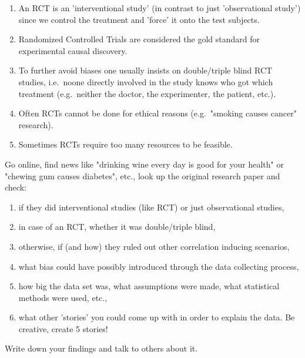 \begin{Disc}
    \begin{enumerate}
        \item An RCT is an 'interventional study' (in contrast to just 'observational study') since we control the treatment and 'force' it onto the test subjects.
        \item Randomized Controlled Trials are considered the gold standard for experimental causal discovery.
        \item To further avoid biases one usually insists on double/triple blind RCT studies, 
            i.e.\ noone directly involved in the study knows who got which treatment 
            (e.g.\ neither the doctor, the experimenter, the patient, etc.). 
        \item Often RCTs cannot be done for ethical reasons (e.g.\ "smoking causes cancer" research).
        \item Sometimes RCTs require too many resources to be feasible.
    \end{enumerate}
\end{Disc}


\begin{Exc}
    Go online, find news like "drinking wine every day is good for your health" or "chewing gum causes diabetes", etc., 
    look up the original research paper and check:
    \begin{enumerate}
        \item if they did interventional studies (like RCT) or just observational studies,
        \item in case of an RCT, whether it was double/triple blind,
        \item otherwise, if (and how) they ruled out other correlation inducing scenarios,
        \item what bias could have possibly introduced through the data collecting process,
        \item how big the data set was, what assumptions were made, what statistical methods were used, etc.,
        \item what other 'stories' you could come up with in order to explain the data. Be creative, create 5 stories!
    \end{enumerate}
    Write down your findings and talk to others about it.
\end{Exc}
